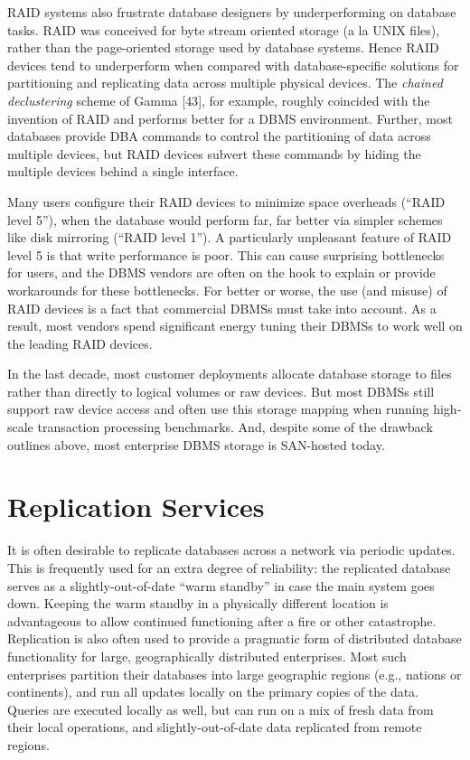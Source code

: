\documentclass[b5paper,11pt,twoside,openright]{book}
\begin{document}
RAID systems also frustrate database designers by underperforming on
database tasks. RAID was conceived for byte stream oriented storage (a
la UNIX files), rather than the page-oriented storage used by database
systems. Hence RAID devices tend to underperform when compared with
database-specific solutions for partitioning and replicating data across
multiple physical devices. The \emph{chained declustering} scheme of
Gamma {[}43{]}, for example, roughly coincided with the invention of
RAID and performs better for a DBMS environment. Further, most databases
provide DBA commands to control the partitioning of data across multiple
devices, but RAID devices subvert these commands by hiding the multiple
devices behind a single interface.

Many users configure their RAID devices to minimize space overheads
(``RAID level 5''), when the database would perform far, far better via
simpler schemes like disk mirroring (``RAID level 1''). A particularly
unpleasant feature of RAID level 5 is that write performance is poor.
This can cause surprising bottlenecks for users, and the DBMS vendors
are often on the hook to explain or provide workarounds for these
bottlenecks. For better or worse, the use (and misuse) of RAID devices
is a fact that commercial DBMSs must take into account. As a result,
most vendors spend significant energy tuning their DBMSs to work well on
the leading RAID devices.

In the last decade, most customer deployments allocate database storage
to files rather than directly to logical volumes or raw devices. But
most DBMSs still support raw device access and often use this storage
mapping when running high-scale transaction processing benchmarks. And,
despite some of the drawback outlines above, most enterprise DBMS
storage is SAN-hosted today.

\hypertarget{replication-services}{%
\section{Replication Services}\label{replication-services}}

It is often desirable to replicate databases across a network via
periodic updates. This is frequently used for an extra degree of
reliability: the replicated database serves as a slightly-out-of-date
``warm standby'' in case the main system goes down. Keeping the warm
standby in a physically different location is advantageous to allow
continued functioning after a fire or other catastrophe. Replication is
also often used to provide a pragmatic form of distributed database
functionality for large, geographically distributed enterprises. Most
such enterprises partition their databases into large geographic regions
(e.g., nations or continents), and run all updates locally on the
primary copies of the data. Queries are executed locally as well, but
can run on a mix of fresh data from their local operations, and
slightly-out-of-date data replicated from remote regions.
\end{document}
